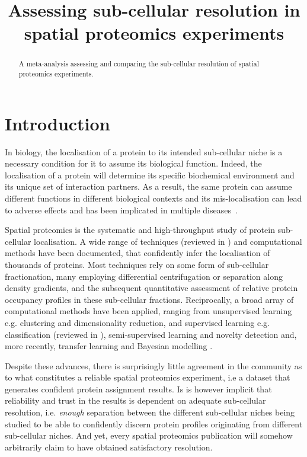 \documentclass[12pt]{article}\usepackage[]{graphicx}\usepackage[]{color}
\title{Assessing sub-cellular resolution in  spatial proteomics experiments}
\author[]{}
\begin{document}
\maketitle

\begin{abstract}
  A meta-analysis assessing and comparing the sub-cellular resolution
  of spatial proteomics experiments.
\end{abstract}







\section{Introduction}

In biology, the localisation of a protein to its intended sub-cellular
niche is a necessary condition for it to assume its biological
function. Indeed, the localisation of a protein will determine its
specific biochemical environment and its unique set of interaction
partners. As a result, the same protein can assume different functions
in different biological contexts and its mis-localisation can lead to
adverse effects and has been implicated in multiple
diseases~\citep{Shin:2013,Cody:2013,Siljee:2018}.


Spatial proteomics is the systematic and high-throughput study of
protein sub-cellular localisation. A wide range of techniques
(reviewed in \citep{Gatto:2010,Tharkeshwar:2018}) and computational
methods \citep{Gatto:2014} have been documented, that confidently
infer the localisation of thousands of proteins. Most techniques rely
on some form of sub-cellular fractionation, many employing
differential centrifugation or separation along density gradients, and
the subsequent quantitative assessment of relative protein occupancy
profiles in these sub-cellular fractions. Reciprocally, a broad array
of computational methods have been applied, ranging from unsupervised
learning e.g. clustering \citep{Tomizioli:2014} and dimensionality
reduction, and supervised learning e.g. classification (reviewed in
\citep{Gatto:2014}), semi-supervised learning and novelty detection
\citep{Breckels:2013} and, more recently, transfer learning
\citep{Breckels:2016} and Bayesian modelling \citep{Crook:2018}.

Despite these advances, there is surprisingly little agreement in the
community as to what constitutes a reliable spatial proteomics
experiment, i.e a dataset that generates confident protein assignment
results. Is is however implicit that reliability and trust in the
results is dependent on adequate sub-cellular resolution,
i.e. \textit{enough} separation between the different sub-cellular
niches being studied to be able to confidently discern protein profiles
originating from different sub-cellular niches. And yet, every spatial
proteomics publication will somehow arbitrarily claim to have obtained
satisfactory resolution.
\end{document}
